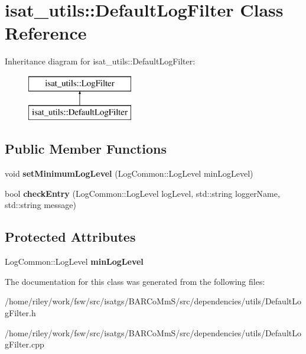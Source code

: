 \hypertarget{classisat__utils_1_1_default_log_filter}{}\section{isat\+\_\+utils\+:\+:Default\+Log\+Filter Class Reference}
\label{classisat__utils_1_1_default_log_filter}
Inheritance diagram for isat\+\_\+utils\+:\+:Default\+Log\+Filter\+:\begin{figure}[H]
\begin{center}
\leavevmode
\includegraphics[height=2.000000cm]{classisat__utils_1_1_default_log_filter}
\end{center}
\end{figure}
\subsection*{Public Member Functions}
\begin{DoxyCompactItemize}
\item 
void {\bfseries set\+Minimum\+Log\+Level} (Log\+Common\+::\+Log\+Level min\+Log\+Level)\hypertarget{classisat__utils_1_1_default_log_filter_a7c739de097c001abd976172df5e032f3}{}\label{classisat__utils_1_1_default_log_filter_a7c739de097c001abd976172df5e032f3}

\item 
bool {\bfseries check\+Entry} (Log\+Common\+::\+Log\+Level log\+Level, std\+::string logger\+Name, std\+::string message)\hypertarget{classisat__utils_1_1_default_log_filter_ab2f4283bc320cd69c9316052f1dedc77}{}\label{classisat__utils_1_1_default_log_filter_ab2f4283bc320cd69c9316052f1dedc77}

\end{DoxyCompactItemize}
\subsection*{Protected Attributes}
\begin{DoxyCompactItemize}
\item 
Log\+Common\+::\+Log\+Level {\bfseries min\+Log\+Level}\hypertarget{classisat__utils_1_1_default_log_filter_ac63a7dfcd5dcc6f182998f4ce967f4d5}{}\label{classisat__utils_1_1_default_log_filter_ac63a7dfcd5dcc6f182998f4ce967f4d5}

\end{DoxyCompactItemize}


The documentation for this class was generated from the following files\+:\begin{DoxyCompactItemize}
\item 
/home/riley/work/fsw/src/isatgs/\+B\+A\+R\+Co\+Mm\+S/src/dependencies/utils/Default\+Log\+Filter.\+h\item 
/home/riley/work/fsw/src/isatgs/\+B\+A\+R\+Co\+Mm\+S/src/dependencies/utils/Default\+Log\+Filter.\+cpp\end{DoxyCompactItemize}
